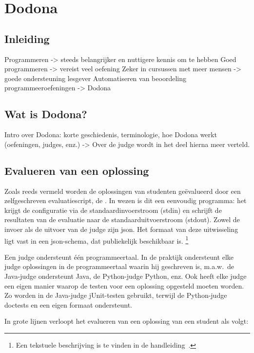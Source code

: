 \chapter{Dodona}\label{ch:dodona}

\section{Inleiding}\label{sec:inleiding}

Programmeren -> steeds belangrijker en nuttigere kennis om te hebben
Goed programmeren -> vereist veel oefening
Zeker in cursussen met meer mensen -> goede ondersteuning lesgever
Automatiseren van beoordeling programmeeroefeningen -> Dodona

\section{Wat is Dodona?}\label{sec:wat-is-dodona}

Intro over Dodona: korte geschiedenis, terminologie, hoe Dodona werkt (oefeningen, judges, enz.)
-> Over de judge wordt in het deel hierna meer verteld.

\section{Evalueren van een oplossing}\label{sec:evalueren-van-een-oplossing}

Zoals reeds vermeld worden de oplossingen van studenten geëvalueerd door een zelfgeschreven evaluatiescript, de .
In wezen is dit een eenvoudig programma: het krijgt de configuratie via de standaardinvoerstroom (stdin) en schrijft de resultaten van de evaluatie naar de standaarduitvoerstroom (stdout).
Zowel de invoer als de uitvoer van de judge zijn json.
Het formaat van deze uitwisseling ligt vast in een json-schema, dat publiekelijk beschikbaar is.
\footnote{Een tekstuele beschrijving is te vinden in de handleiding~\autocite{dodona2020}.}

Een judge ondersteunt één programmeertaal.
In de praktijk ondersteunt elke judge oplossingen in de programmeertaal waarin hij geschreven is, m.a.w.\ de Java-judge ondersteunt Java, de Python-judge Python, enz.
Ook heeft elke judge een eigen manier waarop de testen voor een oplossing opgesteld moeten worden.
Zo worden in de Java-judge jUnit-testen gebruikt, terwijl de Python-judge doctests en een eigen formaat ondersteunt.

In grote lijnen verloopt het evalueren van een oplossing van een student als volgt:

